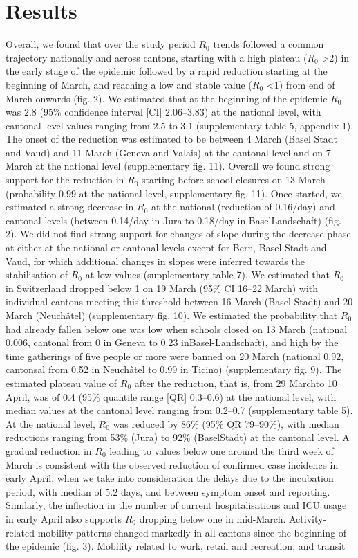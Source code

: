 \section{Results}
Overall, we found that over the study period $R_0$ trends followed a common trajectory nationally and across cantons, starting with a high plateau ($R_0$ >2) in the early stage of the epidemic followed by a rapid reduction starting at the beginning of March, and reaching a low and stable value ($R_0$ <1) from end of March onwards (fig. 2). We estimated that at the beginning of the epidemic $R_0$ was 2.8 (95\% confidence interval [CI] 2.06–3.83) at the national level, with cantonal-level values ranging from 2.5 to 3.1 (supplementary table 5, appendix 1). The onset of the reduction was estimated to be between 4 March (Basel Stadt and Vaud) and 11 March (Geneva and Valais) at the cantonal level and on 7 March at the national level (supplementary fig. 11). Overall we found strong support for the reduction in $R_0$ starting before school closures on 13 March (probability 0.99 at the national level, supplementary fig. 11). Once started, we estimated a strong decrease in $R_0$ at the national (reduction of 0.16/day) and cantonal levels (between 0.14/day in Jura to 0.18/day in BaselLandschaft) (fig. 2). We did not find strong support for changes of slope during the decrease phase at either at the national or cantonal levels except for Bern, Basel-Stadt and Vaud, for which additional changes in slopes were inferred towards the stabilisation of $R_0$ at low values (supplementary table 7). We estimated that $R_0$ in Switzerland dropped below 1 on 19 March (95\% CI 16–22 March) with individual cantons meeting this threshold between 16 March (Basel-Stadt) and 20 March (Neuchâtel) (supplementary fig. 10). We estimated the probability that $R_0$ had already fallen below one was low when schools closed on 13 March (national 0.006, cantonal from 0 in Geneva to 0.23 inBasel-Landschaft), and high by the time gatherings of five people or more were banned on 20 March (national 0.92, cantonsal from 0.52 in Neuchâtel to 0.99 in Ticino) (supplementary fig. 9). The estimated plateau value of $R_0$ after the reduction, that is, from 29 Marchto 10 April, was of 0.4 (95\% quantile range [QR] 0.3–0.6) at the national level, with median values at the cantonal level ranging from 0.2–0.7 (supplementary table 5). At the national level, $R_0$ was reduced by 86\% (95\% QR 79–90\%), with median reductions ranging from 53\% (Jura) to 92\% (BaselStadt) at the cantonal level. A gradual reduction in $R_0$ leading to values below one around the third week of March is consistent with the observed reduction of confirmed case incidence in early April, when we take into consideration the delays due to the incubation period, with median of 5.2 days\cite{Lauer:IncubationPeriodCoronavirus:2020}, and between symptom onset and reporting\cite{Bi:EpidemiologyTransmissionCOVID19:2020}. Similarly, the inflection in the number of current hospitalisations and ICU usage in early April also supports $R_0$ dropping below one in mid-March. Activity-related mobility patterns changed markedly in all cantons since the beginning of the epidemic (fig. 3). Mobility related to work, retail and recreation, and transit 